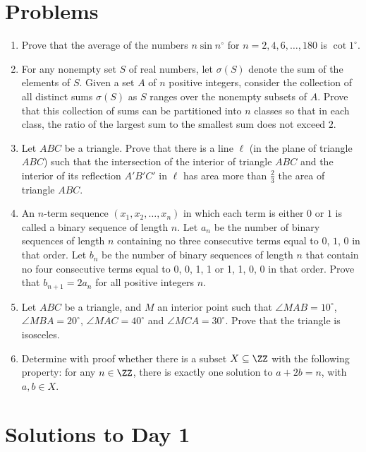 \documentclass[11pt]{scrartcl}
\begin{document}
\section{Problems}
\begin{enumerate}[\bfseries 1.]
\item %
Prove that the average of the numbers $n \sin n^{\circ}$ for
$n = 2,4,6,\dots,180$ is $\cot 1^{\circ}$.

\item %
For any nonempty set $S$ of real numbers,
let $\sigma(S)$ denote the sum of the elements of $S$.
Given a set $A$ of $n$ positive integers,
consider the collection of all distinct sums $\sigma(S)$ as $S$ ranges
over the nonempty subsets of $A$.
Prove that this collection of sums can be
partitioned into $n$ classes so that in each class,
the ratio of the largest sum to the smallest sum does not exceed $2$.

\item %
Let $ABC$ be a triangle. Prove that there is a line $\ell$ (in the plane
of triangle $ABC$) such that the intersection of the interior of
triangle $ABC$ and the interior of its reflection $A'B'C'$ in $\ell$ has
area more than $\frac23$ the area of triangle $ABC$.

\item %
An $n$-term sequence $(x_1, x_2, \dots, x_n)$
in which each term is either $0$ or $1$ is called a binary sequence of length $n$.
Let $a_n$ be the number of binary sequences of length $n$ containing
no three consecutive terms equal to $0$, $1$, $0$ in that order.
Let $b_n$ be the number of binary sequences of length $n$ that
contain no four consecutive terms equal to 0, 0, 1, 1 or 1, 1, 0, 0 in that order.
Prove that $b_{n+1} = 2a_n$ for all positive integers $n$.

\item %
Let $ABC$ be a triangle,
and $M$ an interior point such that
$\angle MAB=10^\circ$, $\angle MBA=20^\circ$,
$\angle MAC=40^\circ$ and $\angle MCA=30^\circ$.
Prove that the triangle is isosceles.

\item %
Determine with proof whether there is a subset $X \subseteq \ZZ$
with the following property: for any $n \in \ZZ$,
there is exactly one solution to $a+2b = n$, with $a,b \in X$.

\end{enumerate}
\pagebreak

\section{Solutions to Day 1}
\end{document}
